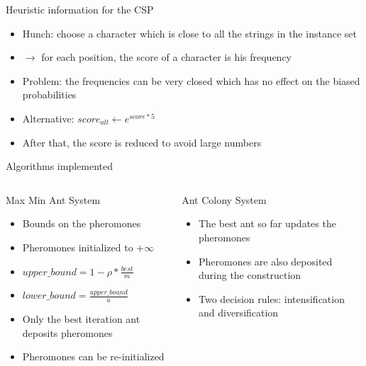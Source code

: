 \documentclass{beamer}
\begin{document}
\begin{frame}{Heuristic information for the CSP}
    \begin{itemize}
        \item Hunch: choose a character which is close to all the strings in the instance set
        \item $\rightarrow$ for each position, the score of a character is his frequency
        \item Problem: the frequencies can be very closed which has no effect on the biased probabilities
        \item Alternative: $score_{alt} \leftarrow e^{score*5}$
        \item After that, the score is reduced to avoid large numbers
    \end{itemize}
\end{frame}

\begin{frame}{Algorithms implemented}

    \begin{columns}[t]

        \begin{column}{0.5\textwidth}
            \begin{block}{Max Min Ant System}
                \begin{itemize}
                    \item Bounds on the pheromones
                    \item Pheromones initialized to $+\infty$
                    \item $upper\_bound = 1-\rho*\frac{best}{m}$
                    \item $lower\_bound = \frac{upper\_bound}{a}$
                    \item Only the best iteration ant deposits pheromones
                    \item Pheromones can be re-initialized
                \end{itemize}
            \end{block}
        \end{column}

        \begin{column}{0.5\textwidth}
            \begin{block}{Ant Colony System}
                \begin{itemize}
                    \item The best ant so far updates the pheromones
                    \item Pheromones are also deposited during the construction
                    \item Two decision rules: intensification and diversification
                \end{itemize}
            \end{block}
        \end{column}

    \end{columns}

\end{frame}
\end{document}
